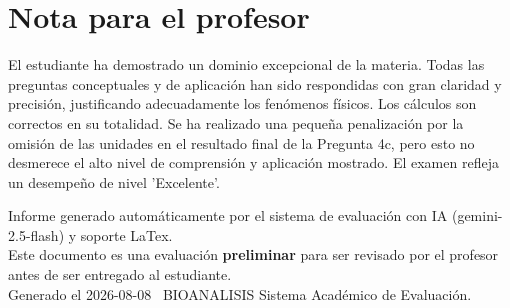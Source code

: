 \documentclass[11pt,a4paper]{article}
\begin{document}
\section*{Nota para el profesor}
\begin{tcolorbox}[
  enhanced, breakable,
  colback=yellow!8, colframe=yellow!60!black,
  fonttitle=\bfseries, coltitle=black,
  title={Observaciones para revisión manual},
  top=4pt, bottom=4pt, left=8pt, right=8pt,
]
El estudiante ha demostrado un dominio excepcional de la materia. Todas las preguntas conceptuales y de aplicación han sido respondidas con gran claridad y precisión, justificando adecuadamente los fenómenos físicos. Los cálculos son correctos en su totalidad. Se ha realizado una pequeña penalización por la omisión de las unidades en el resultado final de la Pregunta 4c, pero esto no desmerece el alto nivel de comprensión y aplicación mostrado. El examen refleja un desempeño de nivel 'Excelente'.
\end{tcolorbox}

\vspace{12pt}
\begin{center}
  \footnotesize\color{gray}
  Informe generado automáticamente por el sistema de evaluación con IA (gemini-2.5-flash) y soporte LaTex. \\
  Este documento es una evaluación \textbf{preliminar} para ser revisado por el profesor antes de ser entregado al 
  estudiante. \\
  Generado el 2026-08-08 \textbullet\ BIOANALISIS Sistema Académico de Evaluación.
  \end{center}
\end{document}
